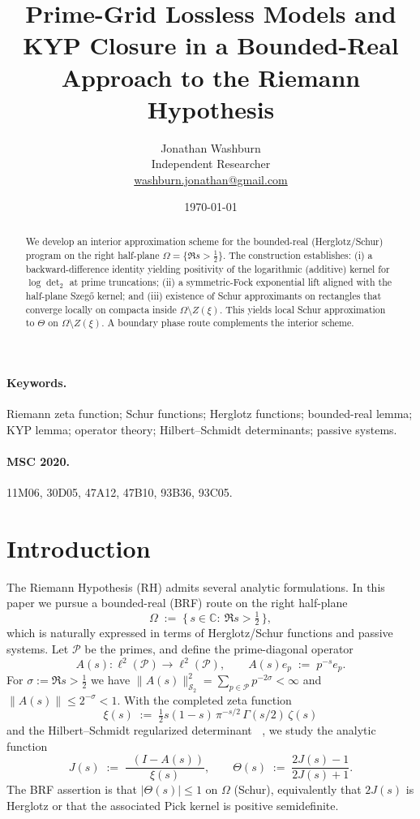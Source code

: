 \documentclass[11pt]{article}
\title{Prime-Grid Lossless Models and KYP Closure in a Bounded-Real Approach to the Riemann Hypothesis}
\author{Jonathan Washburn\\ Independent Researcher\\ \href{mailto:washburn.jonathan@gmail.com}{washburn.jonathan@gmail.com}}
\date{\today}
\theoremstyle{remark}
\newcommand{\C}{\mathbb{C}}
\newcommand{\PP}{\mathcal{P}}
\newcommand{\HS}{\mathcal{S}_2}
\newcommand{\Half}{\{\,s\in\C:\ \Re s>\tfrac12\,\}}
\DeclareMathOperator{\dettwo}{det_2}
\begin{document}
\maketitle

\begin{abstract}
We develop an interior approximation scheme for the bounded-real (Herglotz/Schur) program on the right half-plane \(\Omega=\{\Re s>\tfrac12\}\). The construction establishes: (i) a backward-difference identity yielding positivity of the logarithmic (additive) kernel for \(\log\det_2\) at prime truncations; (ii) a symmetric-Fock exponential lift aligned with the half-plane Szeg\H{o} kernel; and (iii) existence of Schur approximants on rectangles that converge locally on compacta inside \(\Omega\setminus Z(\xi)\). This yields local Schur approximation to \(\Theta\) on \(\Omega\setminus Z(\xi)\). A boundary phase route complements the interior scheme.
\end{abstract}

\paragraph{Keywords.} Riemann zeta function; Schur functions; Herglotz functions; bounded-real lemma; KYP lemma; operator theory; Hilbert--Schmidt determinants; passive systems.

\paragraph{MSC 2020.} 11M06, 30D05, 47A12, 47B10, 93B36, 93C05.

\section{Introduction}
The Riemann Hypothesis (RH) admits several analytic formulations. In this paper we pursue a bounded-real (BRF) route on the right half-plane
\[
 \Omega\;:=\;\Half,
\]
which is naturally expressed in terms of Herglotz/Schur functions and passive systems. Let \(\PP\) be the primes, and define the prime-diagonal operator
\[
 A(s):\ell^2(\PP)\to\ell^2(\PP),\qquad A(s)e_p\;:=\;p^{-s}e_p.
\]
For \(\sigma:=\Re s>\tfrac12\) we have \(\|A(s)\|_{\HS}^2=\sum_{p\in\PP}p^{-2\sigma}<\infty\) and \(\|A(s)\|\le 2^{-\sigma}<1\). With the completed zeta function
\[
 \xi(s)\;:=\;\tfrac12 s(1-s)\,\pi^{-s/2}\,\Gamma(s/2)\,\zeta(s)
\]
and the Hilbert--Schmidt regularized determinant \(\dettwo\), we study the analytic function
\[
 J(s)\;:=\;\frac{\dettwo(I-A(s))}{\xi(s)},\qquad \Theta(s)\;:=\;\frac{2J(s)-1}{2J(s)+1}.
\]
The BRF assertion is that \(|\Theta(s)|\le 1\) on \(\Omega\) (Schur), equivalently that \(2J(s)\) is Herglotz or that the associated Pick kernel is positive semidefinite.
\end{document}
